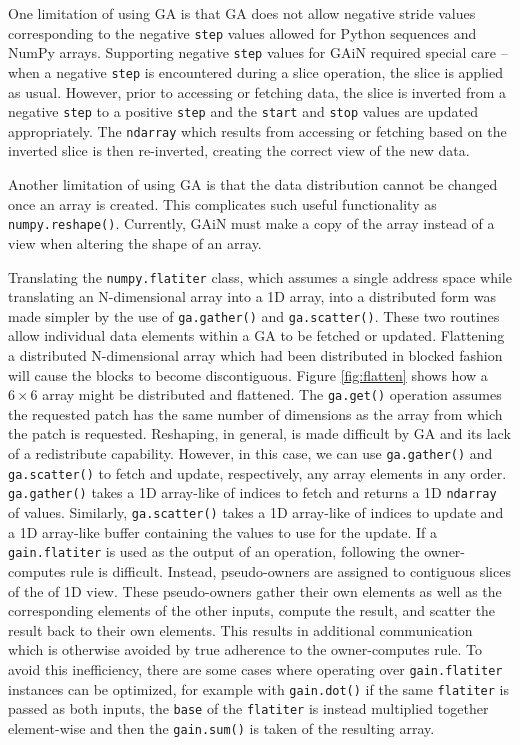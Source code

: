 \documentclass[preprint]{sigplanconf}
\begin{document}
One limitation of using GA is that GA does not allow negative stride values
corresponding to the negative \verb=step= values allowed for Python sequences
and NumPy arrays. Supporting negative \verb=step= values for GAiN required
special care -- when a negative \verb=step= is encountered during a slice
operation, the slice is applied as usual. However, prior to accessing or
fetching data, the slice is inverted from a negative \verb=step= to a positive
\verb=step= and the \verb=start= and \verb=stop= values are updated
appropriately. The \verb=ndarray= which results from accessing or fetching
based on the inverted slice is then re-inverted, creating the correct view of
the new data.

Another limitation of using GA is that the data distribution cannot be changed
once an array is created. This complicates such useful functionality as
\verb=numpy.reshape()=. Currently, GAiN must make a copy of the array instead
of a view when altering the shape of an array.


Translating the \verb=numpy.flatiter= class, which assumes a single address
space while translating an N-dimensional array into a 1D array, into a
distributed form was made simpler by the use of \verb=ga.gather()= and
\verb=ga.scatter()=. These two routines allow individual data elements within
a GA to be fetched or updated.  Flattening a distributed N-dimensional array
which had been distributed in blocked fashion will cause the blocks to become
discontiguous. Figure \ref{fig:flatten} shows how a $6 \times 6$ array
might be distributed and flattened.  The \verb=ga.get()= operation assumes the
requested patch has the same number of dimensions as the array from which the
patch is requested. Reshaping, in general, is made difficult by GA and its
lack of a redistribute capability.  However, in this case, we can use
\verb=ga.gather()= and \verb=ga.scatter()= to fetch and update, respectively,
any array elements in any order.  \verb=ga.gather()= takes a 1D array-like of
indices to fetch and returns a 1D \verb=ndarray= of values. Similarly,
\verb=ga.scatter()= takes a 1D array-like of indices to update and a 1D
array-like buffer containing the values to use for the update. If a
\verb=gain.flatiter= is used as the output of an operation, following the
owner-computes rule is difficult. Instead, pseudo-owners are assigned to
contiguous slices of the of 1D view. These pseudo-owners gather their own
elements as well as the corresponding elements of the other inputs, compute
the result, and scatter the result back to their own elements. This results in
additional communication which is otherwise avoided by true adherence to the
owner-computes rule. To avoid this inefficiency, there are some cases where
operating over \verb=gain.flatiter= instances can be optimized, for example
with \verb=gain.dot()= if the same \verb=flatiter= is passed as both inputs,
the \verb=base= of the \verb=flatiter= is instead multiplied together
element-wise and then the \verb=gain.sum()= is taken of the resulting array.
\end{document}
